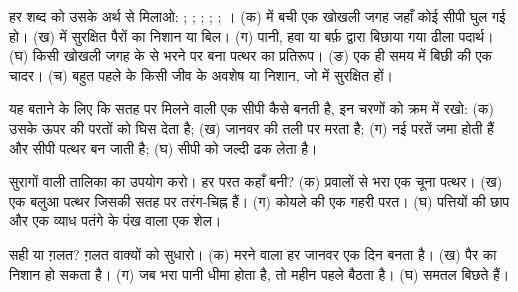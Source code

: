 \begin{exercise}[$\star$]\label{exo:g7:sediments-and-fossils:1}
हर शब्द को उसके अर्थ से मिलाओ: ; ; ; ; ; ।
(क)  में बची एक खोखली जगह जहाँ कोई सीपी घुल गई हो। (ख)  में सुरक्षित
पैरों का निशान या बिल। (ग) पानी, हवा या बर्फ़ द्वारा बिछाया गया ढीला पदार्थ।
(घ) किसी खोखली जगह के  से भरने पर बना पत्थर का प्रतिरूप। (ङ) एक ही समय में
बिछी  की एक चादर। (च) बहुत पहले के किसी जीव के अवशेष या निशान, जो  में
सुरक्षित हों।
\end{exercise}

\begin{exercise}[$\star$]\label{exo:g7:sediments-and-fossils:2}
यह बताने के लिए कि सतह पर मिलने वाली एक सीपी  कैसे बनती है, इन चरणों को
क्रम में रखो: (क)  उसके ऊपर की परतों को घिस देता है; (ख) जानवर  की
तली पर मरता है; (ग) नई परतें जमा होती हैं और सीपी पत्थर बन जाती है; (घ) 
सीपी को जल्दी ढक लेता है।
\end{exercise}

\begin{exercise}[$\star$]\label{exo:g7:sediments-and-fossils:3}
सुरागों वाली तालिका का उपयोग करो। हर परत कहाँ बनी? (क) प्रवालों से भरा एक चूना
पत्थर। (ख) एक बलुआ पत्थर जिसकी सतह पर तरंग-चिह्न हैं। (ग) कोयले की एक गहरी परत।
(घ) पत्तियों की छाप और एक व्याध पतंगे के पंख वाला एक शेल।
\end{exercise}

\begin{exercise}[$\star$]\label{exo:g7:sediments-and-fossils:4}
सही या ग़लत? ग़लत वाक्यों को सुधारो। (क) मरने वाला हर जानवर एक दिन  बनता
है। (ख) पैर का निशान  हो सकता है। (ग) जब  भरा पानी धीमा होता है, तो
महीन  पहले बैठता है। (घ)  समतल
बिछते हैं।
\end{exercise}

